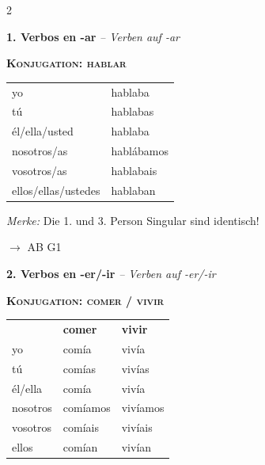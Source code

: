 \documentclass[11pt, a4paper]{article}
\newcommand{\de}[1]{\textit{\textcolor{akzent}{#1}}}
\newcommand{\gram}[1]{\textsc{#1}}
\newcommand{\abmark}[1]{{\footnotesize\textcolor{akzent}{$\rightarrow$ AB #1}}}
\newcommand{\abschnitt}[2]{\noindent\textbf{\large #1. #2}}
\newcommand{\stamm}[1]{\textcolor{colorrojo}{#1}}
\begin{document}
\begin{multicols}{2}

\abschnitt{1}{Verbos en -ar} \de{-- Verben auf -ar}

\vspace{4pt}

\begin{grammatikbox}
\textbf{\gram{Konjugation: hablar}}

\vspace{4pt}
{\small
\begin{tabular}{@{}ll@{}}
yo & habl\stamm{aba} \\[0.3em]
tú & habl\stamm{abas} \\[0.3em]
él/ella/usted & habl\stamm{aba} \\[0.3em]
nosotros/as & habl\stamm{ábamos} \\[0.3em]
vosotros/as & habl\stamm{abais} \\[0.3em]
ellos/ellas/ustedes & habl\stamm{aban} \\
\end{tabular}}
\end{grammatikbox}

\begin{tippbox}
\footnotesize\textit{Merke:} Die 1. und 3. Person Singular sind identisch!
\end{tippbox}

\abmark{G1}

\vspace{8pt}

\abschnitt{2}{Verbos en -er/-ir} \de{-- Verben auf -er/-ir}

\vspace{4pt}

\begin{grammatikbox}
\textbf{\gram{Konjugation: comer / vivir}}

\vspace{4pt}
{\small
\begin{tabular}{@{}lll@{}}
& \textbf{comer} & \textbf{vivir} \\[0.3em]
yo & com\stamm{ía} & viv\stamm{ía} \\[0.3em]
tú & com\stamm{ías} & viv\stamm{ías} \\[0.3em]
él/ella & com\stamm{ía} & viv\stamm{ía} \\[0.3em]
nosotros & com\stamm{íamos} & viv\stamm{íamos} \\[0.3em]
vosotros & com\stamm{íais} & viv\stamm{íais} \\[0.3em]
ellos & com\stamm{ían} & viv\stamm{ían} \\
\end{tabular}}
\end{grammatikbox}


\end{multicols}
\end{document}
